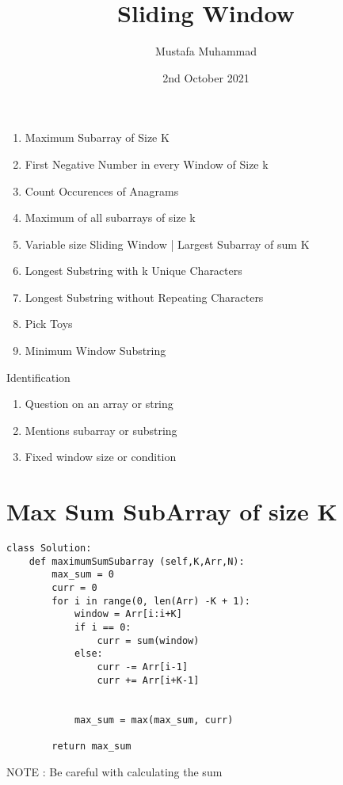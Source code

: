\documentclass[a4]{article}
\title{Sliding Window}
\author{Mustafa Muhammad}
\date{2nd October 2021}
\begin{document}
\maketitle

\newpage
\begin{enumerate}
	\item Maximum Subarray of Size K
	\item First Negative Number in every Window of Size k
	\item Count Occurences of Anagrams
	\item Maximum of all subarrays of size k
	\item Variable size Sliding Window | Largest Subarray of sum K
	\item Longest Substring with k Unique Characters
	\item Longest Substring without Repeating Characters
	\item Pick Toys
	\item Minimum Window Substring
\end{enumerate}

Identification
\begin{enumerate}
	\item Question on an array or string
	\item Mentions subarray or substring
	\item Fixed window size or condition
\end{enumerate}

\newpage
\section{Max Sum SubArray of size K}
\begin{lstlisting}
class Solution:
    def maximumSumSubarray (self,K,Arr,N):
        max_sum = 0
        curr = 0
        for i in range(0, len(Arr) -K + 1):
            window = Arr[i:i+K]
            if i == 0:
                curr = sum(window)
            else:
                curr -= Arr[i-1]
                curr += Arr[i+K-1]
                
            
            max_sum = max(max_sum, curr)
        
        return max_sum
\end{lstlisting}

NOTE : Be careful with calculating the sum
\end{document}
